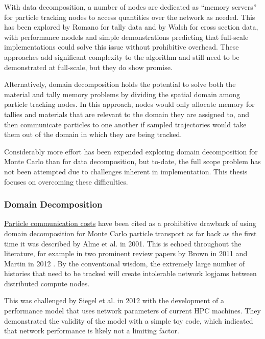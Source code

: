 \documentclass[12pt,twoside]{mitthesis-exec}
\begin{document}
With data decomposition, a number of nodes are dedicated as ``memory servers''
for particle tracking nodes to access quantities over the network as needed.
This has been explored by Romano for tally data \cite{Romano201320} and by Walsh
\cite{walsh_ms_thesis} for cross section data, with performance models and
simple demonstrations predicting that full-scale implementations could solve
this issue without prohibitive overhead. These approaches add significant
complexity to the algorithm and still need to be demonstrated at full-scale, but
they do show promise.

Alternatively, domain decomposition holds the potential to solve both the
material and tally memory problems by dividing the spatial domain among particle
tracking nodes. In this approach, nodes would only allocate
memory for tallies and materials that are relevant to the domain they are
assigned to, and then communicate particles to one another if sampled
trajectories would take them out of the domain in which they are being tracked.

Considerably more effort has been expended exploring domain decomposition for
Monte Carlo than for data decomposition, but to-date, the full scope
problem has not been attempted due to challenges
inherent in implementation. This thesis focuses on overcoming these
difficulties.

\subsubsection*{Domain Decomposition}

\underline{Particle communication costs} have been cited as a prohibitive
drawback of using domain decomposition for Monte Carlo particle transport as far
back as the first time it was described by Alme et al. \cite{js-alme-2001} in
2001. This is echoed throughout the literature, for example in two prominent
review papers by Brown in 2011 \cite{forrest_mc_prospects} and Martin in 2012
\cite{martin_chall}. By the conventional wisdom, the extremely large number of
histories that need to be tracked will create intolerable network logjams
between distributed compute nodes.

This was challenged by Siegel et al. in 2012 \cite{Siegel1} with the
development of a performance model that uses network parameters of current
HPC machines. They demonstrated the validity of the model with a simple toy
code, which indicated that network performance is likely not a limiting factor.
\end{document}
